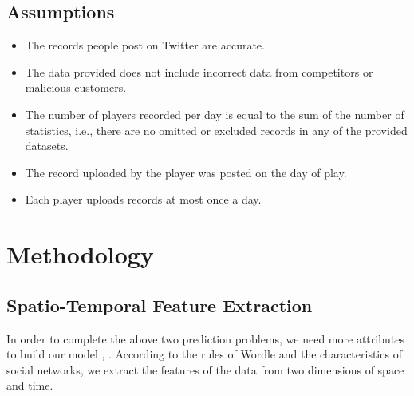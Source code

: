 \documentclass[a4paper]{jpconf}
\begin{document}
\subsection{Assumptions}
\begin{itemize}
    \item The records people post on Twitter are accurate.
    \item The data provided does not include incorrect data from competitors or malicious customers.
    \item The number of players recorded per day is equal to the sum of the number of statistics, i.e., there are no omitted or excluded records in any of the provided datasets.
    \item The record uploaded by the player was posted on the day of play.
    \item Each player uploads records at most once a day.
\end{itemize}






\section{Methodology} 
\subsection{Spatio-Temporal Feature Extraction}
In order to complete the above two prediction problems, we need more attributes to build our model \cite{yuan2021survey}, \cite{siami2019performance}. According to the rules of Wordle and the characteristics of social networks, we extract the features of the data from two dimensions of space and time.
\end{document}
